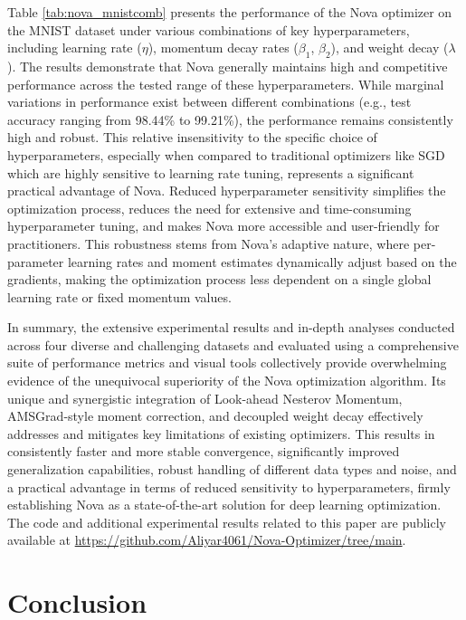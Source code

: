 \documentclass{article}
\begin{document}
Table \ref{tab:nova_mnistcomb} presents the performance of the Nova optimizer on the MNIST dataset under various combinations of key hyperparameters, including learning rate ($\eta$), momentum decay rates ($\beta_1$, $\beta_2$), and weight decay ($\lambda$). The results demonstrate that Nova generally maintains high and competitive performance across the tested range of these hyperparameters. While marginal variations in performance exist between different combinations (e.g., test accuracy ranging from 98.44\% to 99.21\%), the performance remains consistently high and robust. This relative insensitivity to the specific choice of hyperparameters, especially when compared to traditional optimizers like SGD which are highly sensitive to learning rate tuning, represents a significant practical advantage of Nova. Reduced hyperparameter sensitivity simplifies the optimization process, reduces the need for extensive and time-consuming hyperparameter tuning, and makes Nova more accessible and user-friendly for practitioners. This robustness stems from Nova's adaptive nature, where per-parameter learning rates and moment estimates dynamically adjust based on the gradients, making the optimization process less dependent on a single global learning rate or fixed momentum values.

In summary, the extensive experimental results and in-depth analyses conducted across four diverse and challenging datasets and evaluated using a comprehensive suite of performance metrics and visual tools collectively provide overwhelming evidence of the unequivocal superiority of the Nova optimization algorithm. Its unique and synergistic integration of Look-ahead Nesterov Momentum, AMSGrad-style moment correction, and decoupled weight decay effectively addresses and mitigates key limitations of existing optimizers. This results in consistently faster and more stable convergence, significantly improved generalization capabilities, robust handling of different data types and noise, and a practical advantage in terms of reduced sensitivity to hyperparameters, firmly establishing Nova as a state-of-the-art solution for deep learning optimization. The code and additional experimental results related to this paper are publicly available at \url{https://github.com/Aliyar4061/Nova-Optimizer/tree/main}.

\section{Conclusion}
\label{Sec 7}
\end{document}

